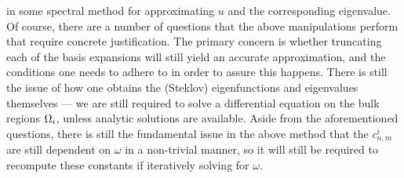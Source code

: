 in some spectral method for approximating $u$ and the corresponding eigenvalue.
Of course, there are a number of questions that the above manipulations perform that require concrete justification.
The primary concern is whether truncating each of the basis expansions will still yield an accurate approximation, and the conditions one needs to adhere to in order to assure this happens.
There is still the issue of how one obtains the (Steklov) eigenfunctions and eigenvalues themselves --- we are still required to solve a differential equation on the bulk regions $\Omega_i$, unless analytic solutions are available.
Aside from the aforementioned questions, there is still the fundamental issue in the above method that the $c_{n,m}^i$ are still dependent on $\omega$ in a non-trivial manner, so it will still be required to recompute these constants if iteratively solving for $\omega$.